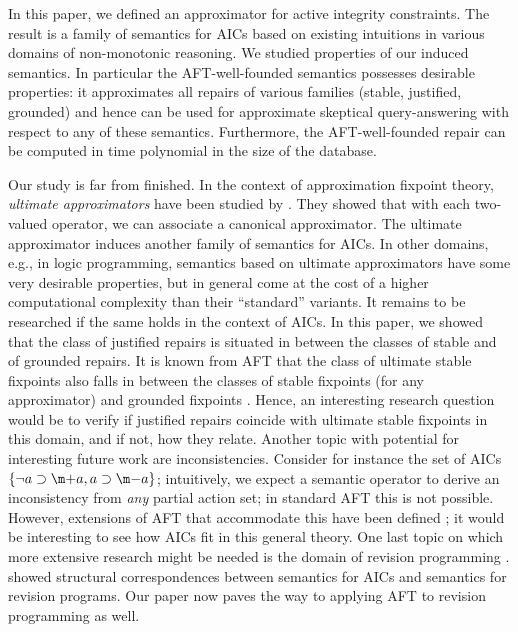 In this paper, we defined an approximator for active integrity constraints. 
The result is a family of semantics for AICs based on existing intuitions in various domains of non-monotonic reasoning. 
We studied properties of our induced semantics. 
In particular the AFT-well-founded semantics possesses desirable properties: it approximates all repairs of various families (stable, justified, grounded) and hence can be used for approximate skeptical query-answering with respect to any of these semantics. 
Furthermore, the AFT-well-founded repair can be computed in time polynomial in the size of the database. 

Our study is far from finished. 
In the context of approximation fixpoint theory, \emph{ultimate approximators} have been studied by \citet{DeneckerMT04}. 
They showed that with each two-valued operator, we can associate a canonical approximator. 
The ultimate approximator induces another family of semantics for AICs. 
In other domains, e.g., in logic programming, semantics based on ultimate approximators have some very desirable properties, but in general come at the cost of a higher computational complexity than their ``standard'' variants. 
It remains to be researched if the same holds in the context of AICs. 
In this paper, we showed that the class of justified repairs is situated in between the classes of stable and of grounded repairs. 
It is known from AFT that the class of ultimate stable fixpoints also falls in between the classes of stable fixpoints (for any approximator) and grounded fixpoints . 
Hence, an interesting research question would be to verify if justified repairs coincide with ultimate stable fixpoints in this domain, and if not, how they relate. 
Another topic with potential for interesting future work are inconsistencies. Consider for instance the set of AICs $\{\lnot a \aicrule \add a, a \aicrule \remove a\}$; intuitively, we expect a semantic operator to derive an inconsistency from \emph{any} partial action set; in standard AFT this is not possible. However, extensions of AFT that accommodate this have been defined \cite{RR/BiJF14}; it would be interesting to see how AICs fit in this general theory. 
One last topic on which more extensive research might be needed is the domain of revision programming \cite{tcs/MarekT98}. \citet{tplp/CaropreseT11} showed structural correspondences between semantics for AICs and semantics for revision programs. 
Our paper now paves the way to applying AFT to revision programming as well. 

% 
% 
% 
% 
% 

